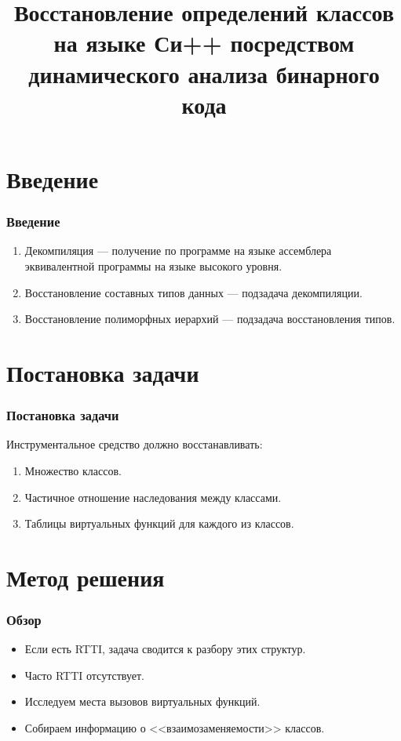 \documentclass{beamer}
\title{Восстановление определений классов на языке Си++ посредством динамического анализа бинарного кода}
\author[Пётр Прохоренков]{Прохоренков~П.В.\\гр. 527\vskip0.7cmНаучный~руководитель\\к.ф-м.н,~доц.~Чернов~А.В.}
\institute{Факультет ВМиК\\Кафедра системного программирования}
\date{}
\begin{document}
\begin{frame}[plain]
\titlepage
\end{frame}

\section{Введение}
\begin{frame}
\frametitle{Введение}
\begin{Large}
\begin{enumerate}
	\item \alert{Декомпиляция} --- получение по программе на языке ассемблера эквивалентной программы на языке высокого уровня.
	\item \alert{Восстановление составных типов данных} --- подзадача декомпиляции.
    \item \alert{Восстановление полиморфных иерархий} --- подзадача восстановления типов.
\end{enumerate}
\end{Large}
\end{frame}

\section{Постановка задачи}
\begin{frame}
\frametitle{Постановка задачи}
\begin{Large}
Инструментальное средство должно восстанавливать:
\begin{enumerate}
\item Множество классов.
\item Частичное отношение наследования между классами.
\item Таблицы виртуальных функций для каждого из классов.
\end{enumerate}
\end{Large}
\end{frame}

\section{Метод решения}
\begin{frame}
\frametitle{Обзор}
\begin{Large}
\begin{itemize}
    \item Если есть RTTI, задача сводится к разбору этих структур.
    \item Часто RTTI отсутствует.
    \item Исследуем места вызовов виртуальных функций.
    \item Собираем информацию о <<взаимозаменяемости>> классов.
\end{itemize}
\end{Large}
\end{frame}
\end{document}
